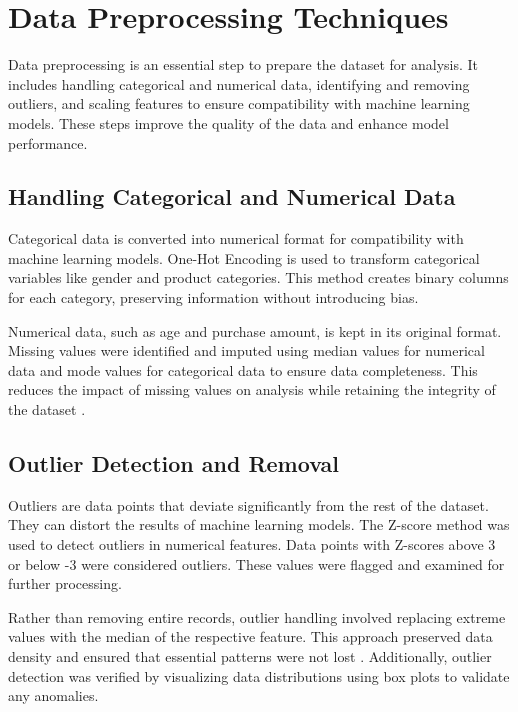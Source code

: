 \documentclass[12pt, a4paper,twoside]{report}
\theoremstyle{plain} %
\theoremstyle{definition} %
\theoremstyle{remark} %
\numberwithin{equation}{chapter}
\begin{document}
\section{Data Preprocessing Techniques}

Data preprocessing is an essential step to prepare the dataset for analysis. It includes handling categorical and numerical data, identifying and removing outliers, and scaling features to ensure compatibility with machine learning models. These steps improve the quality of the data and enhance model performance.

\subsection{Handling Categorical and Numerical Data}

Categorical data is converted into numerical format for compatibility with machine learning models. One-Hot Encoding is used to transform categorical variables like gender and product categories. This method creates binary columns for each category, preserving information without introducing bias.

Numerical data, such as age and purchase amount, is kept in its original format. Missing values were identified and imputed using median values for numerical data and mode values for categorical data to ensure data completeness. This reduces the impact of missing values on analysis while retaining the integrity of the dataset \cite{jones2021data}.

\subsection{Outlier Detection and Removal}

Outliers are data points that deviate significantly from the rest of the dataset. They can distort the results of machine learning models. The Z-score method was used to detect outliers in numerical features. Data points with Z-scores above 3 or below -3 were considered outliers. These values were flagged and examined for further processing.

Rather than removing entire records, outlier handling involved replacing extreme values with the median of the respective feature. This approach preserved data density and ensured that essential patterns were not lost \cite{aggarwal2017outliers}. Additionally, outlier detection was verified by visualizing data distributions using box plots to validate any anomalies.
\end{document}
